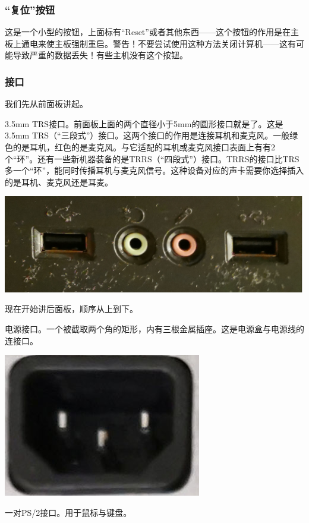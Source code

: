 \subsubsection{“复位”按钮}
这是一个小型的按钮，上面标有“Reset”或者其他东西——这个按钮的作用是在主板上通电来使主板强制重启。{\color{red}警告！不要尝试使用这种方法关闭计算机——这有可能导致严重的数据丢失！}有些主机没有这个按钮。
\subsubsection{接口}
我们先从前面板讲起。\par
3.5mm TRS接口。前面板上面的两个直径小于5mm的圆形接口就是了。这是3.5mm TRS（“三段式”）接口。这两个接口的作用是连接耳机和麦克风。一般绿色的是耳机，红色的是麦克风。与它适配的耳机或麦克风接口表面上有有2个“环”。还有一些新机器装备的是TRRS（“四段式”）接口。TRRS的接口比TRS多一个“环”，能同时传播耳机与麦克风信号。这种设备对应的声卡需要你选择插入的是耳机、麦克风还是耳麦。
\begin{center}
	\includegraphics[scale=0.06]{pic/Box1}
\end{center}\par
现在开始讲后面板，顺序从上到下。\par
电源接口。一个被截取两个角的矩形，内有三根金属插座。这是电源盒与电源线的连接口。
\begin{center}
	\includegraphics[scale=0.3]{pic/Power}
\end{center}\par
一对PS/2接口。用于鼠标与键盘。
